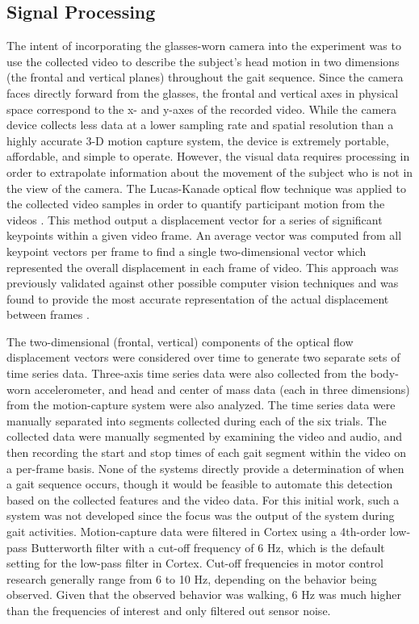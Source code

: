 \documentclass[12pt]{report}
\begin{document}
\subsection{Signal Processing}
The intent of incorporating the glasses-worn camera into the experiment was to use the collected video to describe the subject's head motion in two dimensions (the frontal and vertical planes) throughout the gait sequence. Since the camera faces directly forward from the glasses, the frontal and vertical axes in physical space correspond to the x- and y-axes of the recorded video. While the camera device collects less data at a lower sampling rate and spatial resolution than a highly accurate 3-D motion capture system, the device is extremely portable, affordable, and simple to operate. However, the visual data requires processing in order to extrapolate information about the movement of the subject who is not in the view of the camera. The Lucas-Kanade optical flow technique was applied to the collected video samples in order to quantify participant motion from the videos \cite{Lucas1981AnVision}. This method output a displacement vector for a series of significant keypoints within a given video frame. An average vector was computed from all keypoint vectors per frame to find a single two-dimensional vector which represented the overall displacement in each frame of video. This approach was previously validated against other possible computer vision techniques and was found to provide the most accurate representation of the actual displacement between frames \cite{Schneider2017PreliminaryProcessing}.

The two-dimensional (frontal, vertical) components of the optical flow displacement vectors were considered over time to generate two separate sets of time series data. Three-axis time series data were also collected from the body-worn accelerometer, and head and center of mass data (each in three dimensions) from the motion-capture system were also analyzed. The time series data were manually separated into segments collected during each of the six trials. The collected data were manually segmented by examining the video and audio, and then recording the start and stop times of each gait segment within the video on a per-frame basis. None of the systems directly provide a determination of when a gait sequence occurs, though it would be feasible to automate this detection based on the collected features and the video data. For this initial work, such a system was not developed since the focus was the output of the system during gait activities. Motion-capture data were filtered in Cortex using a 4th-order low-pass Butterworth filter with a cut-off frequency of 6 Hz, which is the default setting for the low-pass filter in Cortex. Cut-off frequencies in motor control research generally range from 6 to 10 Hz, depending on the behavior being observed. Given that the observed behavior was walking, 6 Hz was much higher than the frequencies of interest and only filtered out sensor noise.
\end{document}
